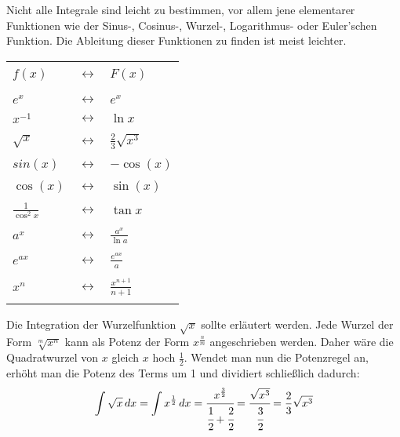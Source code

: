 \pagebreak


Nicht alle Integrale sind leicht zu bestimmen, vor allem jene elementarer Funktionen wie der Sinus-, Cosinus-, Wurzel-, Logarithmus- oder Euler'schen Funktion. Die Ableitung dieser Funktionen zu finden ist meist leichter.

\vspace{\parskip}

\begin{table}[h!]
	\centering
	\large
	\begin{tabular}{| >{\centering\arraybackslash}p{1.5cm}
	 				  c
	 				  >{\centering\arraybackslash}p{1.5cm} |}
		\hline
		&& \\
		$f(x)$ & $\longleftrightarrow$ & $F(x)$
		\\ && \\ \hline && \\
		$e^x$ & $\longleftrightarrow$ & $e^x$
		\\ && \\
		$x^{-1}$ & $\longleftrightarrow$ & $\ln x$
		\\ && \\
		$\sqrt{x}$ & $\longleftrightarrow$ & $\frac{2}{3}\sqrt{x^3}$
		\\ && \\
		$sin(x)$ & $\longleftrightarrow$ & $-\cos(x)$
		\\ && \\
		$\cos(x)$ & $\longleftrightarrow$ & $\sin(x)$
		\\ && \\
		$\frac{1}{\cos^2 x}$ & $\longleftrightarrow$ & $\tan x$
		\\ && \\
		$a^x$ & $\longleftrightarrow$ & $\frac{a^x}{\ln a}$
		\\ && \\
		$e^{ax}$ & $\longleftrightarrow$ & $\frac{e^{ax}}{a}$
		\\ && \\
		$x^n$ & $\longleftrightarrow$ & $\frac{x^{n + 1}}{n + 1}$
		\\ && \\
		\hline
	\end{tabular}
\end{table}

\vspace{\parskip}

Die Integration der Wurzelfunktion $\sqrt{x}$ sollte erl\"{a}utert werden. Jede Wurzel der Form $\sqrt[m]{x^n}$ kann als Potenz der Form $x^{\frac{n}{m}}$ angeschrieben werden. Daher w\"{a}re die Quadratwurzel von $x$ gleich $x$ hoch $\frac{1}{2}$. Wendet man nun die Potenzregel an, erh\"{o}ht man die Potenz des Terms um 1 und dividiert schlie\ss{}lich dadurch: $$\int \sqrt{x} \,dx = \int x^{\frac{1}{2}} \,dx = \cfrac{x^{\frac{3}{2}}}{\cfrac{1}{2} + \cfrac{2}{2}} = \cfrac{\sqrt{x^3}}{\cfrac{3}{2}} = \frac{2}{3} \sqrt{x^3}$$

